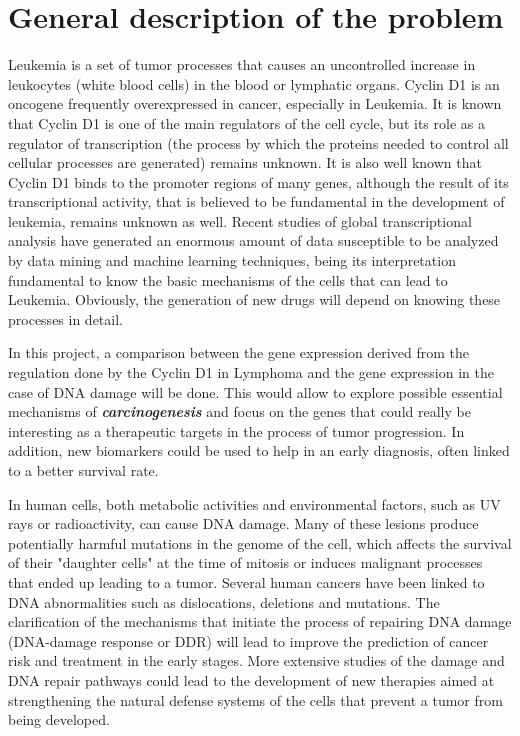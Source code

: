 
\section{General description of the problem}

Leukemia is a set of tumor processes that causes an uncontrolled increase in leukocytes (white blood cells) in the blood or lymphatic organs. Cyclin D1 is an oncogene frequently overexpressed in cancer, especially in Leukemia.
It is known that Cyclin D1 is one of the main regulators of the cell cycle, but its role as a regulator of transcription (the process by which the proteins needed to control all cellular processes are generated) remains unknown.
It is also well known that Cyclin D1 binds to the promoter regions of many genes, although the result of its transcriptional activity, that is believed to be fundamental in the development of leukemia, remains unknown as well.
Recent studies of global transcriptional analysis have generated an enormous amount of data susceptible to be analyzed by data mining and machine learning techniques, being its interpretation fundamental to know the basic mechanisms of the cells that can lead to Leukemia.
Obviously, the generation of new drugs will depend on knowing these processes in detail.

In this project, a comparison between the gene expression derived from the regulation done by the Cyclin D1 in Lymphoma and the gene expression in the case of DNA damage will be done. This would allow to explore possible essential mechanisms of \textbf{\textit{carcinogenesis}} and focus on the genes that could really be interesting as a therapeutic targets in the process of tumor progression. In addition, new biomarkers could be used to help in an early diagnosis, often linked to a better survival rate.

In human cells, both metabolic activities and environmental factors, such as UV rays or radioactivity, can cause DNA damage. Many of these lesions produce potentially harmful mutations in the genome of the cell, which affects the survival of their "daughter cells" at the time of mitosis or induces malignant processes that ended up leading to a tumor. Several human cancers have been linked to DNA abnormalities such as dislocations, deletions and mutations. The clarification of the mechanisms that initiate the process of repairing DNA damage (DNA-damage response or DDR) will lead to improve the prediction of cancer risk and treatment in the early stages. More extensive studies of the damage and DNA repair pathways could lead to the development of new therapies aimed at strengthening the natural defense systems of the cells that prevent a tumor from being developed.


